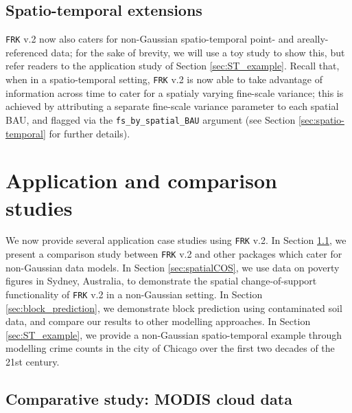 \documentclass[12pt,a4paper]{article}
\begin{document}
\subsection{Spatio-temporal extensions}\label{sec:03:Additonal_features}

\texttt{FRK} v.2 now also caters for non-Gaussian spatio-temporal point- and areally-referenced data; for the sake of brevity, we will use a toy study to show this, but refer readers to the application study of Section \ref{sec:ST_example}.
Recall that, when in a spatio-temporal setting, \texttt{FRK} v.2 is now able to take advantage of information across time to cater for a spatialy varying fine-scale variance; this is achieved by attributing a separate fine-scale variance parameter to each spatial BAU, and flagged via the \texttt{fs\_by\_spatial\_BAU} argument (see Section \ref{sec:spatio-temporal} for further details).




\section{Application and comparison studies}\label{SEC:ApplicationStudy}

We now provide several application case studies using \texttt{FRK} v.2.
In Section \ref{sec:04-01:MODIS}, we present a comparison study between \texttt{FRK} v.2 and other packages which cater for non-Gaussian data models. 
In Section \ref{sec:spatialCOS}, we use data on poverty figures in Sydney, Australia, to demonstrate the spatial change-of-support functionality of \texttt{FRK} v.2 in a non-Gaussian setting.
In Section \ref{sec:block_prediction}, we demonstrate block prediction using contaminated soil data, and compare our results to other modelling approaches.
In Section \ref{sec:ST_example}, we provide a non-Gaussian spatio-temporal example through modelling crime counts in the city of Chicago over the first two decades of the 21st century.



\subsection{Comparative study: MODIS cloud data}\label{sec:04-01:MODIS}

\end{document}
